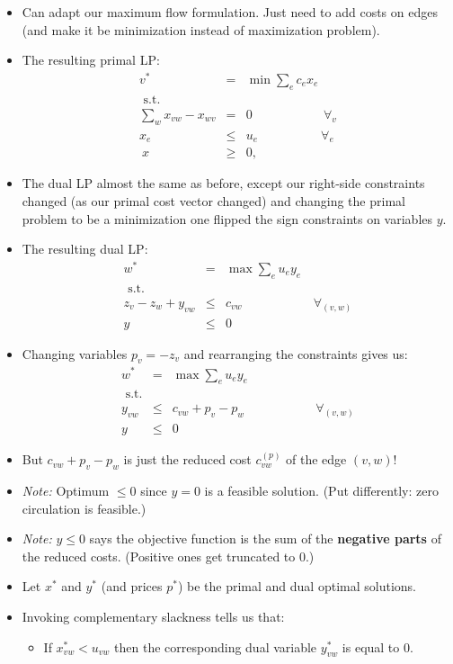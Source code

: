 \documentclass{article}
\begin{document}
\begin{itemize}
\item Can adapt our maximum flow formulation. Just need to add costs on edges (and make it be minimization instead of maximization problem).
\item The resulting primal LP:
\begin{eqnarray*}
v^*&=&\min \sum_e c_{e} x_{e}\\
\text{ s.t.} & &\\
\sum_w x_{vw}-x_{wv} &= &0 \quad \quad\quad\quad\quad \text{  $\forall_{v}$}\\
x_{e} &\le &u_{e} \quad \quad\quad\quad\quad \text{$\forall_{e}$}\\\
x &\ge &0,
\end{eqnarray*}
\item The dual LP almost the same as before, except our right-side constraints changed (as our primal cost vector changed) and changing the primal problem to be a minimization one flipped the sign constraints on variables $y$. 
\item The resulting dual LP:
\begin{eqnarray*}
w^*&=&\max \sum_{e} u_e y_{e}\\
\text{ s.t.} & &\\
z_v-z_w+y_{vw} &\le & c_{vw} \quad \quad\quad\quad\quad \text{  $\forall_{(v,w)}$}\\
y &\le &0
\end{eqnarray*}
\item Changing variables $p_v=-z_v$ and rearranging the constraints gives us:
\begin{eqnarray*}
w^*&=&\max \sum_{e} u_e y_{e}\\
\text{ s.t.} & &\\
y_{vw} &\le & c_{vw} +p_v -p_w \quad \quad\quad\quad\quad \text{  $\forall_{(v,w)}$}\\
y &\le &0
\end{eqnarray*}
\item But $c_{vw} +p_v -p_w $ is just the reduced cost $c^{(p)}_{vw}$ of the edge $(v,w)$!
\item {\em Note:} Optimum $\le 0$ since $y=0$ is a feasible solution. (Put differently: zero circulation is feasible.)
\item {\em Note:} $y\le 0$ says the objective function is the sum of
  the {\bf negative parts} of the reduced costs. (Positive ones get truncated to $0$.)
  \item Let $x^*$ and $y^*$ (and prices $p^*$) be the primal and dual optimal solutions. 
 \item Invoking complementary slackness tells us that:
\begin{itemize}
\item If $x_{vw}^*<u_{vw}$ then the corresponding dual variable $y_{vw}^*$ is equal to $0$. 


\end{itemize}
\end{itemize}
\end{document}
